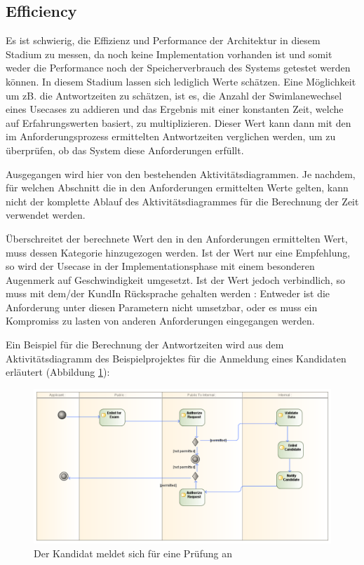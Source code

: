 \subsection{Efficiency}
Es ist schwierig, die Effizienz und Performance der Architektur in diesem Stadium zu messen, da noch keine Implementation vorhanden ist und somit weder die Performance noch der Speicherverbrauch des Systems getestet werden können. In diesem Stadium lassen sich lediglich Werte schätzen. Eine Möglichkeit um zB. die Antwortzeiten zu schätzen, ist es, die Anzahl der Swimlanewechsel eines Usecases zu addieren und das Ergebnis mit einer konstanten Zeit, welche auf Erfahrungswerten basiert, zu multiplizieren. Dieser Wert kann dann mit den im Anforderungsprozess ermittelten Antwortzeiten verglichen werden, um zu überprüfen, ob das System diese Anforderungen erfüllt.

Ausgegangen wird hier von den bestehenden Aktivitätsdiagrammen. Je nachdem, für welchen Abschnitt die in den Anforderungen ermittelten Werte gelten, kann nicht der komplette Ablauf des Aktivitätsdiagrammes für die Berechnung der Zeit verwendet werden.

Überschreitet der berechnete Wert den in den Anforderungen ermittelten Wert, muss dessen Kategorie hinzugezogen werden. Ist der Wert nur eine Empfehlung, so wird der Usecase in der Implementationsphase mit einem besonderen Augenmerk auf Geschwindigkeit umgesetzt. Ist der Wert jedoch verbindlich, so muss mit dem/der KundIn Rücksprache gehalten werden \cite[S. 70]{effektiv}: Entweder ist die Anforderung unter diesen Parametern nicht umsetzbar, oder es muss ein Kompromiss zu lasten von anderen Anforderungen eingegangen werden.

Ein Beispiel für die Berechnung der Antwortzeiten wird aus dem Aktivitätsdiagramm des Beispielprojektes für die Anmeldung eines Kandidaten erläutert (Abbildung \ref{fig:applycomplicated}):

\begin{figure}[H]
    \centering
    \includegraphics[scale=0.4]{uml/applycomplicated.png}
    \caption{Der Kandidat meldet sich für eine Prüfung an}
    \label{fig:applycomplicated}
\end{figure}

